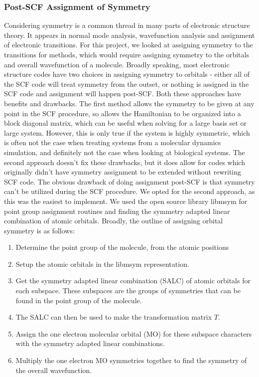 \subsubsection{Post-SCF Assignment of Symmetry}
\label{subsubsec:post_scf_symmetry}

Considering symmetry is a common thread in many parts of electronic structure 
theory. It appears in normal mode analysis, wavefunction analysis and assignment
of electronic transitions. For this project, we looked at assigning symmetry to 
the transitions for \dscf methods, which would require assigning symmetry to the
orbitals and overall wavefunction of a molecule.
Broadly speaking, most electronic structure codes have two choices in assigning
symmetry to orbitals - either all of the SCF code will treat symmetry from the 
outset, or nothing is assigned in the SCF code and assignment will happen post-SCF.
Both these approaches have benefits and drawbacks. The first method allows the 
symmetry to be given at any point in the SCF procedure, so allows the Hamiltonian
to be organized into a block diagonal matrix, which can be useful when solving
for a large basis set or large system. However, this is only true if the system 
is highly symmetric, which is often not the case when treating systems from a 
molecular dynamics simulation, and definitely not the case when looking at biological
systems.
The second approach doesn't fix these drawbacks, but it does allow for codes which
originally didn't have symmetry assignment to be extended without rewriting SCF
code. The obvious drawback of doing assignment post-SCF is that symmetry can't be
utilized during the SCF procedure.
We opted for the second approach, as this was the easiest to implement. We used 
the open source library libmsym for point group assignment routines and finding
the symmetry adapted linear combination of atomic orbitals. Broadly, the outline
of assigning orbital symmetry is as follows:
\begin{enumerate}
    \item Determine the point group of the molecule, from the atomic positions
    \item Setup the atomic orbitals in the libmsym representation.
    \item Get the symmetry adapted linear combination (SALC) of atomic orbitals for 
    each subspace. These subspaces are the groups of symmetries that can be found
    in the point group of the molecule.
    \item The SALC can then be used to make the transformation matrix $T$.
    \item Assign the one electron molecular orbital (MO) for these subspace characters
     with the symmetry adapted linear combinations.
    \item Multiply the one electron MO symmetries together to find the symmetry 
    of the overall wavefunction.
\end{enumerate}

